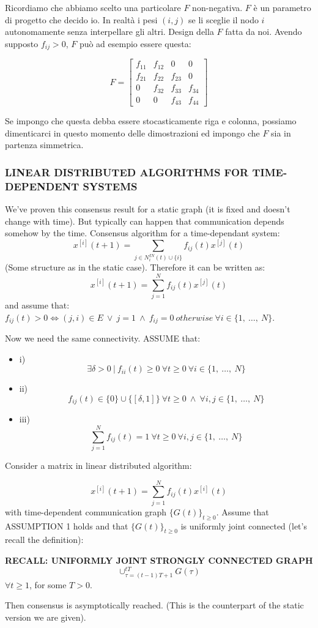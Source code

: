 Ricordiamo che abbiamo scelto una particolare $F$ non-negativa. $F$ è un parametro di progetto che decido io. In realtà i pesi $(i,j)$ se li sceglie il nodo $i$ autonomamente senza interpellare gli altri. Design della $F$ fatta da noi. Avendo supposto $f_{ij}>0$, $F$ può ad esempio essere questa:

\[
	F = \begin{bmatrix}f_{11}&f_{12}&0&0\\f_{21}&f_{22}&f_{23}&0\\0&f_{32}&f_{33}&f_{34}\\0&0&f_{43}&f_{44}\end{bmatrix}
\]

Se impongo che questa debba essere stocasticamente riga e colonna, possiamo dimenticarci in questo momento delle dimostrazioni ed impongo che $F$ sia in partenza simmetrica.
\subsubsection{LINEAR DISTRIBUTED ALGORITHMS FOR TIME-DEPENDENT SYSTEMS}
We've proven this consensus result for a static graph (it is fixed and doesn't change with time). But typically can happen that communication depends somehow by the time. Consensus algorithm for a time-dependant system:
\[
	x^{[i]}(t+1) = \sum_{j\in N_i^{IN}(t)\cup{\{i\}}}{f_{ij}(t)x^{[j]}(t)}
\]
(Some structure as in the static case). Therefore it can be written as:
\[
	x^{[i]}(t+1) = \sum_{j=1}^N{f_{ij}(t)x^{[j]}(t)}
\]
and assume that: $f_{ij}(t) > 0 \iff (j,i)\in E\ \lor\ j=1\ \land\ f_{ij}=0\ otherwise\ \forall i \in\{1,\ \dots,\ N\}$.

Now we need the same connectivity. ASSUME that:
\begin{itemize}
\item{i)}
\[
	\exists \delta > 0\ |\ f_{ii}(t) \geq 0\ \forall t \geq 0\ \forall i \in\{1,\ \dots,\ N\}
\]
\item{ii)}
\[
	f_{ij}(t) \in \{0\} \cup{\{[\delta,1]\}}\ \forall t \geq 0\ \land\ \forall i,j\in\{1,\ \dots,\ N\}
\]
\item{iii)}
\[
	\sum_{j=1}^N{f_{ij}(t)} = 1\ \forall t \geq 0\ \forall i,j\in\{1,\ \dots,\ N\}
\]
\end{itemize}

\begin{thrm}
Consider a matrix in linear distributed algorithm:

\[
	x^{[i]}(t+1) = \sum_{j=1}^N{f_{ij}(t)x^{[i]}(t)}
\]
with time-dependent communication graph $\{G(t)\}_{t\geq 0}$. Assume that ASSUMPTION 1 holds and that $\{G(t)\}_{t\geq 0}$ is uniformly joint connected (let's recall the definition):

\begin{defn}{\textbf{RECALL: UNIFORMLY JOINT STRONGLY CONNECTED GRAPH}} 
\[
	\cup_{\tau=(t-1)T+1}^{tT}{G(\tau)}
\]
$\forall t \geq 1$, for some $T>0$.
\end{defn}

Then consensus is asymptotically reached. (This is the counterpart of the static version we are given).
\end{thrm}

